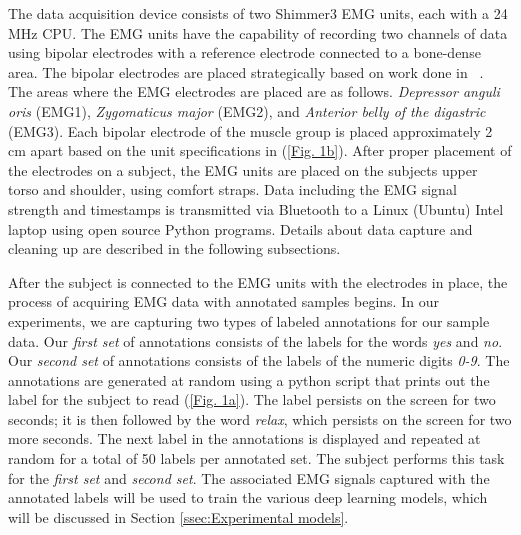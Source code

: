 \documentclass{article}
\begin{document}
The data acquisition device consists of two Shimmer3 EMG units, each with a 24 MHz CPU. The EMG units have the capability of recording two channels of data using  bipolar electrodes with a reference electrode connected to a bone-dense area. The bipolar electrodes are placed strategically based on work done in ~\cite{lopez-larraz_syllable-based_2010}. The areas where the EMG electrodes are placed are as follows. \textit{Depressor anguli oris} (EMG1), \textit{Zygomaticus major} (EMG2), and \textit{Anterior belly of the digastric} (EMG3). Each bipolar electrode of the muscle group is placed approximately 2 cm apart based on the unit specifications in (\figurename \ref{Fig. 1b}). After proper placement of the electrodes on a subject, the EMG units are placed on the subjects upper torso and shoulder, using comfort straps.  Data including the EMG signal strength and timestamps is transmitted via Bluetooth to a Linux (Ubuntu) Intel laptop using  open source Python programs. Details about data capture and cleaning up are described in the following subsections. 

After the subject is connected to the EMG units with the electrodes in place, the process of acquiring EMG data with annotated samples begins. In our experiments, we are capturing two types of labeled annotations for our sample data. Our \textit{first set} of annotations consists of the labels for the words \textit{yes} and \textit{no}. Our \textit{second set} of annotations consists of the labels of the numeric digits \textit{0-9}. The annotations are generated at random using a python script that prints out the label for the subject to read  (\figurename \ref{Fig. 1a}). The label persists on the screen for two seconds; it is then followed by the word \textit{relax}, which persists on the screen for two more seconds. The next label in the annotations is displayed and repeated at random for a total of 50 labels per annotated set. The subject performs this task for the \textit{first set} and \textit{second set}. The associated EMG signals captured with the annotated labels will be used to train the various deep learning models, which will be discussed in Section \ref{ssec:Experimental models}.  
\end{document}
